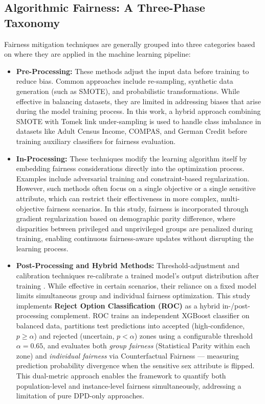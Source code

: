 \documentclass[12pt,a4paper]{article}
\begin{document}
\subsection{Algorithmic Fairness: A Three-Phase Taxonomy}
Fairness mitigation techniques are generally grouped into three categories based on where they are applied in the machine learning pipeline:
\begin{itemize}
    \item \textbf{Pre-Processing:} These methods adjust the input data before training to reduce bias. Common approaches include re-sampling, synthetic data generation (such as SMOTE), and probabilistic transformations. While effective in balancing datasets, they are limited in addressing biases that arise during the model training process. In this work, a hybrid approach combining SMOTE with Tomek link under-sampling is used to handle class imbalance in datasets like Adult Census Income, COMPAS, and German Credit before training auxiliary classifiers for fairness evaluation.
    \item \textbf{In-Processing:} These techniques modify the learning algorithm itself by embedding fairness considerations directly into the optimization process. Examples include adversarial training and constraint-based regularization. However, such methods often focus on a single objective or a single sensitive attribute, which can restrict their effectiveness in more complex, multi-objective fairness scenarios. In this study, fairness is incorporated through gradient regularization based on demographic parity difference, where disparities between privileged and unprivileged groups are penalized during training, enabling continuous fairness-aware updates without disrupting the learning process.
    \item \textbf{Post-Processing and Hybrid Methods:} Threshold-adjustment and calibration techniques re-calibrate a trained model's output distribution after training \cite{hardt2016equality}. While effective in certain scenarios, their reliance on a fixed model limits simultaneous group and individual fairness optimization. This study implements \textbf{Reject Option Classification (ROC)} as a hybrid in-/post-processing complement. ROC trains an independent XGBoost classifier on balanced data, partitions test predictions into accepted (high-confidence, $p \geq \alpha$) and rejected (uncertain, $p < \alpha$) zones using a configurable threshold $\alpha = 0.65$, and evaluates both \emph{group fairness} (Statistical Parity within each zone) and \emph{individual fairness} via Counterfactual Fairness --- measuring prediction probability divergence when the sensitive sex attribute is flipped. This dual-metric approach enables the framework to quantify both population-level and instance-level fairness simultaneously, addressing a limitation of pure DPD-only approaches.
\end{itemize}
\end{document}
